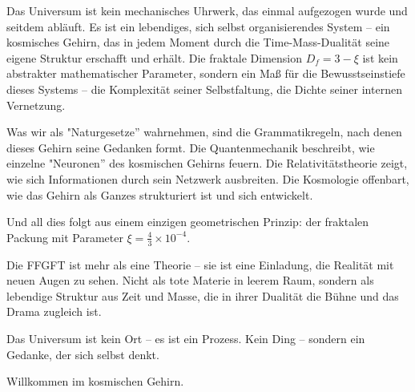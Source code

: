 \documentclass[12pt]{book}
\begin{document}
Das Universum ist kein mechanisches Uhrwerk, das einmal aufgezogen wurde und seitdem abläuft. Es ist ein lebendiges, sich selbst organisierendes System – ein kosmisches Gehirn, das in jedem Moment durch die Time-Mass-Dualität seine eigene Struktur erschafft und erhält. Die fraktale Dimension $D_f = 3 - \xi$ ist kein abstrakter mathematischer Parameter, sondern ein Maß für die Bewusstseinstiefe dieses Systems – die Komplexität seiner Selbstfaltung, die Dichte seiner internen Vernetzung.

Was wir als "Naturgesetze'' wahrnehmen, sind die Grammatikregeln, nach denen dieses Gehirn seine Gedanken formt. Die Quantenmechanik beschreibt, wie einzelne "Neuronen'' des kosmischen Gehirns feuern. Die Relativitätstheorie zeigt, wie sich Informationen durch sein Netzwerk ausbreiten. Die Kosmologie offenbart, wie das Gehirn als Ganzes strukturiert ist und sich entwickelt.

Und all dies folgt aus einem einzigen geometrischen Prinzip: der fraktalen Packung mit Parameter $\xi = \frac{4}{3} \times 10^{-4}$.

Die FFGFT ist mehr als eine Theorie – sie ist eine Einladung, die Realität mit neuen Augen zu sehen. Nicht als tote Materie in leerem Raum, sondern als lebendige Struktur aus Zeit und Masse, die in ihrer Dualität die Bühne und das Drama zugleich ist.

Das Universum ist kein Ort – es ist ein Prozess. Kein Ding – sondern ein Gedanke, der sich selbst denkt.

Willkommen im kosmischen Gehirn.
\end{document}
